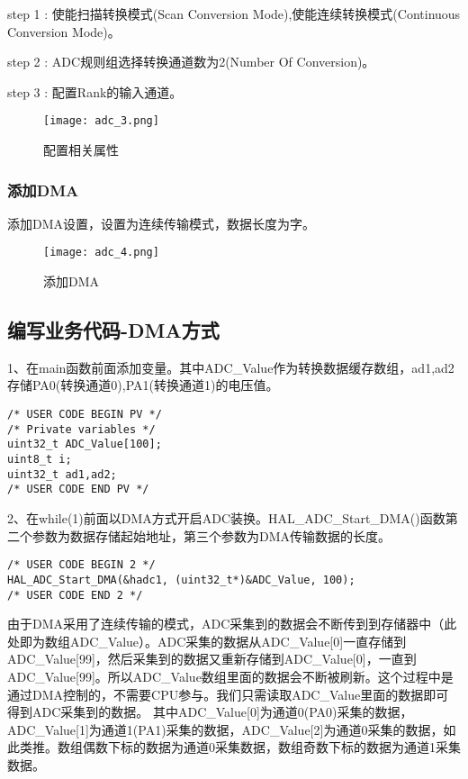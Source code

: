 \documentclass[cn,11pt]{elegantbook}
\begin{document}
step 1 : 使能扫描转换模式(Scan Conversion Mode),使能连续转换模式(Continuous Conversion Mode)。

step 2 : ADC规则组选择转换通道数为2(Number Of Conversion)。

step 3 : 配置Rank的输入通道。

\begin{figure}[htbp]
	\centering
	\texttt{[image: adc\_3.png]}
	\caption{配置相关属性 \label{fig:scatter}}
\end{figure}


\subsubsection{添加DMA}
添加DMA设置，设置为连续传输模式，数据长度为字。

\begin{figure}[htbp]
	\centering
	\texttt{[image: adc\_4.png]}
	\caption{添加DMA \label{fig:scatter}}
\end{figure}

\newpage

\subsection{编写业务代码-DMA方式}

1、在main函数前面添加变量。其中ADC\_Value作为转换数据缓存数组，ad1,ad2存储PA0(转换通道0),PA1(转换通道1)的电压值。

\begin{lstlisting}
/* USER CODE BEGIN PV */
/* Private variables */
uint32_t ADC_Value[100];
uint8_t i;
uint32_t ad1,ad2;
/* USER CODE END PV */
\end{lstlisting}
2、在while(1)前面以DMA方式开启ADC装换。HAL\_ADC\_Start\_DMA()函数第二个参数为数据存储起始地址，第三个参数为DMA传输数据的长度。

\begin{lstlisting}
/* USER CODE BEGIN 2 */
HAL_ADC_Start_DMA(&hadc1, (uint32_t*)&ADC_Value, 100);
/* USER CODE END 2 */
\end{lstlisting}

由于DMA采用了连续传输的模式，ADC采集到的数据会不断传到到存储器中（此处即为数组ADC\_Value）。ADC采集的数据从ADC\_Value[0]一直存储到ADC\_Value[99]，然后采集到的数据又重新存储到ADC\_Value[0]，一直到ADC\_Value[99]。所以ADC\_Value数组里面的数据会不断被刷新。这个过程中是通过DMA控制的，不需要CPU参与。我们只需读取ADC\_Value里面的数据即可得到ADC采集到的数据。
其中ADC\_Value[0]为通道0(PA0)采集的数据，ADC\_Value[1]为通道1(PA1)采集的数据，ADC\_Value[2]为通道0采集的数据，如此类推。数组偶数下标的数据为通道0采集数据，数组奇数下标的数据为通道1采集数据。
\end{document}
